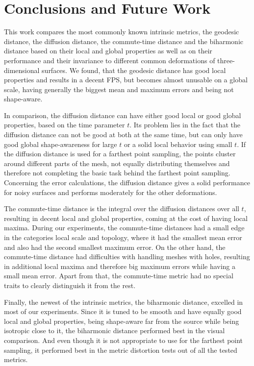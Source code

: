 \chapter{Conclusions and Future Work}
\label{chapter:conclusions}

This work compares the most commonly known intrinsic metrics, the geodesic distance, the diffusion distance, the commute-time distance and the biharmonic distance based on their local and global properties as well as on their performance and their invariance to different common deformations of three-dimensional surfaces.
We found, that the geodesic distance has good local properties and results in a decent FPS, but becomes almost unusable on a global scale, having generally the biggest mean and maximum errors and being not shape-aware.

In comparison, the diffusion distance can have either good local or good global properties, based on the time parameter $t$.
Its problem lies in the fact that the diffusion distance can not be good at both at the same time, but can only have good global shape-awareness for large $t$ or  a solid local behavior using small $t$.
If the diffusion distance is used for a farthest point sampling, the points cluster around different parts of the mesh, not equally distributing themselves and therefore not completing the basic task behind the farthest point sampling.
Concerning the error calculations, the diffusion distance gives a solid performance for noisy surfaces and performs moderately for the other deformations.

The commute-time distance is the integral over the diffusion distances over all $t$, resulting in decent local and global properties, coming at the cost of having local maxima.
During our experiments, the commute-time distances had a small edge in the categories local scale and topology, where it had the smallest mean error and also had the second smallest maximum error.
On the other hand, the commute-time distance had difficulties with handling meshes with holes, resulting in additional local maxima and therefore big maximum errors while having a small mean error.
Apart from that, the commute-time metric had no special traits to clearly distinguish it from the rest.

Finally, the newest of the intrinsic metrics, the biharmonic distance, excelled in most of our experiments.
Since it is tuned to be smooth and have equally good local and global properties, being shape-aware far from the source while being isotropic close to it, the biharmonic distance performed best in the visual comparison.
And even though it is not appropriate to use for the farthest point sampling, it performed best in the metric distortion tests out of all the tested metrics.

